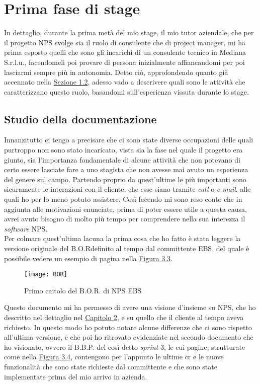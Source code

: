 \section{Prima fase di stage}
\label{prima fase}
In dettaglio, durante la prima metà del mio stage, il mio tutor aziendale, che per il progetto NPS svolge sia il ruolo di consulente che di project manager, mi ha prima esposto quelli che sono gli incarichi di un consulente tecnico in Mediana S.r.l.u., facendomeli poi provare di persona inizialmente affiancandomi per poi lasciarmi sempre più in autonomia. Detto ciò, approfondendo quanto già accennato nella \hyperref[organizzazione]{Sezione 1.2}, adesso vado a descrivere quali sono le attività che caratterizzano questo ruolo, basandomi sull'esperienza vissuta durante lo stage.

\subsection{Studio della documentazione}
Innanzitutto ci tengo a precisare che ci sono state diverse occupazioni delle quali purtroppo non sono stato incaricato, vista sia la fase nel quale il progetto era giunto, sia l'importanza fondamentale di alcune attività che non potevano di certo essere lasciate fare a uno stagista che non avesse mai avuto un esperienza del genere sul campo. Partendo proprio da quest'ultime le più importanti sono sicuramente le interazioni con il cliente, che esse siano tramite \textit{call} o \textit{e-mail}, alle quali ho per lo meno potuto assistere. Così facendo mi sono reso conto che in aggiunta alle motivazioni enunciate, prima di poter essere utile a questa causa, avrei avuto bisogno di molto più tempo per comprendere nella sua interezza il \textit{software} NPS. \\ Per colmare quest'ultima lacuna la prima cosa che ho fatto è stata leggere la versione originale del B.O.R\footnotemark[3] definito al tempo dal committente EBS, del quale è possibile vedere un esempio di pagina nella \hyperref[bor]{Figura 3.3}.
 
\begin{figure}[h!]
\begin{center}
\texttt{[image: BOR]}
\caption{Primo caitolo del B.O.R. di NPS EBS}
\label{bor}
\end{center}
\end{figure}
\FloatBarrier

Questo documento mi ha permesso di avere una visione d'insieme su NPS, che ho descritto nel dettaglio nel \hyperref[cap:progetto-stage]{Capitolo 2}, e su quello che il cliente al tempo aveva richiesto. In questo modo ho potuto notare alcune differenze che ci sono rispetto all'ultima versione, e che poi ho ritrovato evidenziate nel secondo documento che ho visionato, ovvero il B.B.P.\footnotemark[3]
del così detto \textit{sprint} 3, le cui pagine, strutturate come nella \hyperref[bbp]{Figura 3.4}, contengono per l'appunto le ultime \acrshort{cr} e le nuove funzionalità che sono state richieste dal committente e che sono state implementate prima del mio arrivo in azienda.

